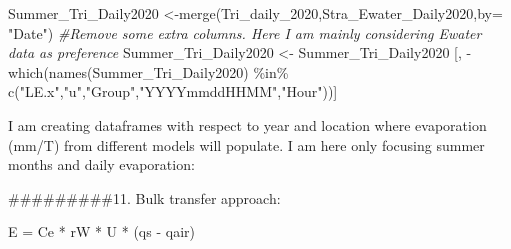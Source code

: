 \documentclass[
]{article}
\newenvironment{Shaded}{\begin{snugshade}}{\end{snugshade}}
\newcommand{\AttributeTok}[1]{\textcolor[rgb]{0.77,0.63,0.00}{#1}}
\newcommand{\CommentTok}[1]{\textcolor[rgb]{0.56,0.35,0.01}{\textit{#1}}}
\newcommand{\DocumentationTok}[1]{\textcolor[rgb]{0.56,0.35,0.01}{\textbf{\textit{#1}}}}
\newcommand{\FunctionTok}[1]{\textcolor[rgb]{0.00,0.00,0.00}{#1}}
\newcommand{\NormalTok}[1]{#1}
\newcommand{\OtherTok}[1]{\textcolor[rgb]{0.56,0.35,0.01}{#1}}
\newcommand{\SpecialCharTok}[1]{\textcolor[rgb]{0.00,0.00,0.00}{#1}}
\newcommand{\StringTok}[1]{\textcolor[rgb]{0.31,0.60,0.02}{#1}}
\begin{document}
\begin{Shaded}
\begin{Highlighting}[]
\NormalTok{Summer\_Tri\_Daily2020 }\OtherTok{\textless{}{-}}\FunctionTok{merge}\NormalTok{(Tri\_daily\_2020,Stra\_Ewater\_Daily2020,}\AttributeTok{by=} \StringTok{"Date"}\NormalTok{)}
\CommentTok{\#Remove some extra columns. Here I am mainly considering Ewater data as preference}
\NormalTok{Summer\_Tri\_Daily2020 }\OtherTok{\textless{}{-}}\NormalTok{ Summer\_Tri\_Daily2020 [, }\SpecialCharTok{{-}}\FunctionTok{which}\NormalTok{(}\FunctionTok{names}\NormalTok{(Summer\_Tri\_Daily2020) }\SpecialCharTok{\%in\%} \FunctionTok{c}\NormalTok{(}\StringTok{"LE.x"}\NormalTok{,}\StringTok{"u"}\NormalTok{,}\StringTok{"Group"}\NormalTok{,}\StringTok{"YYYYmmddHHMM"}\NormalTok{,}\StringTok{"Hour"}\NormalTok{))]}
\end{Highlighting}
\end{Shaded}

I am creating dataframes with respect to year and location where
evaporation (mm/T) from different models will populate. I am here only
focusing summer months and daily evaporation:

\begin{Shaded}
\end{Shaded}

\#\#\#\#\#\#\#\#\#11. Bulk transfer approach:

E = Ce * rW * U * (qs - qair)
\end{document}
